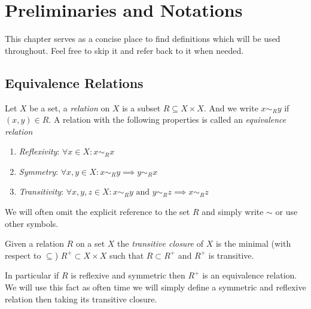 \chapter{Preliminaries and Notations}


This chapter serves as a concise place to find definitions which will be used throughout. Feel free to skip it and refer back to it when needed.

\section{Equivalence Relations}

\begin{definition}{}{}

    Let $X$ be a set, a \emph{relation} on $X$ is a subset $R \subseteq X \times X$. And we write $x \sim_R y$ if $(x,y) \in R$.
    A relation with the following properties is called an \emph{equivalence relation}
    \begin{enumerate}
        \item \emph{Reflexivity}: $\forall x \in X: x \sim_R x$
        \item \emph{Symmetry}: $\forall x,y \in X: x \sim_R y \implies y \sim_R x$
        \item \emph{Transitivity}: $\forall x,y,z \in X: x \sim_R y \text{ and } y \sim_R z \implies x \sim_R z$
    \end{enumerate}
    We will often omit the explicit reference to the set $R$ and simply write $\sim$ or use other symbols.
\end{definition}

\begin{definition}{}{}
    Given a relation $R$ on a set $X$ the \emph{transitive closure} of $X$ is the minimal (with respect to $\subseteq$) $R^+ \subset X \times X$ such that $R \subset R^+$ and $R^+$ is transitive.
\end{definition}

In particular if $R$ is reflexive and symmetric then $R^+$ is an equivalence relation. We will use this fact as often time we will simply define a symmetric and reflexive relation then taking its transitive closure.


